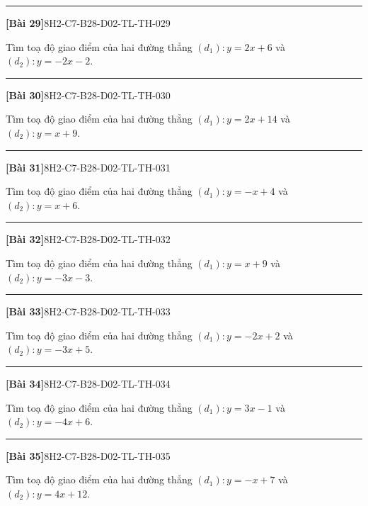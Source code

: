 \documentclass[12pt,a4paper]{article}
\newif\ifloigiai
\newenvironment{cauhoi}[2]{%
  \par\medskip\noindent\rule{\textwidth}{0.4pt}\par\nopagebreak
  \noindent\textbf{[#1]}\hfill{\scriptsize\ttfamily #2}\par\nopagebreak\smallskip}{\par}
\newcommand{\loigiai}[1]{\ifloigiai\par\smallskip\noindent\textit{Lời giải.} #1\par\fi}
\begin{document}
\begin{cauhoi}{Bài 29}{8H2-C7-B28-D02-TL-TH-029}
Tìm toạ độ giao điểm của hai đường thẳng $(d_1): y=2x+6$ và $(d_2): y=-2x-2$.
\loigiai{Hoành độ giao điểm là nghiệm của phương trình $2x+6=-2x-2$, suy ra $4x=-8$ nên $x=-2$. Thay vào $(d_1)$: $y=2\cdot(-2)+6=2$. Vậy giao điểm là $(-2;2)$.}
\end{cauhoi}
\begin{cauhoi}{Bài 30}{8H2-C7-B28-D02-TL-TH-030}
Tìm toạ độ giao điểm của hai đường thẳng $(d_1): y=2x+14$ và $(d_2): y=x+9$.
\loigiai{Hoành độ giao điểm là nghiệm của phương trình $2x+14=x+9$, suy ra $x=-5$ nên $x=-5$. Thay vào $(d_1)$: $y=2\cdot(-5)+14=4$. Vậy giao điểm là $(-5;4)$.}
\end{cauhoi}
\begin{cauhoi}{Bài 31}{8H2-C7-B28-D02-TL-TH-031}
Tìm toạ độ giao điểm của hai đường thẳng $(d_1): y=-x+4$ và $(d_2): y=x+6$.
\loigiai{Hoành độ giao điểm là nghiệm của phương trình $-x+4=x+6$, suy ra $-2x=2$ nên $x=-1$. Thay vào $(d_1)$: $y=-1\cdot(-1)+4=5$. Vậy giao điểm là $(-1;5)$.}
\end{cauhoi}
\begin{cauhoi}{Bài 32}{8H2-C7-B28-D02-TL-TH-032}
Tìm toạ độ giao điểm của hai đường thẳng $(d_1): y=x+9$ và $(d_2): y=-3x-3$.
\loigiai{Hoành độ giao điểm là nghiệm của phương trình $x+9=-3x-3$, suy ra $4x=-12$ nên $x=-3$. Thay vào $(d_1)$: $y=1\cdot(-3)+9=6$. Vậy giao điểm là $(-3;6)$.}
\end{cauhoi}
\begin{cauhoi}{Bài 33}{8H2-C7-B28-D02-TL-TH-033}
Tìm toạ độ giao điểm của hai đường thẳng $(d_1): y=-2x+2$ và $(d_2): y=-3x+5$.
\loigiai{Hoành độ giao điểm là nghiệm của phương trình $-2x+2=-3x+5$, suy ra $x=3$ nên $x=3$. Thay vào $(d_1)$: $y=-2\cdot(3)+2=-4$. Vậy giao điểm là $(3;-4)$.}
\end{cauhoi}
\begin{cauhoi}{Bài 34}{8H2-C7-B28-D02-TL-TH-034}
Tìm toạ độ giao điểm của hai đường thẳng $(d_1): y=3x-1$ và $(d_2): y=-4x+6$.
\loigiai{Hoành độ giao điểm là nghiệm của phương trình $3x-1=-4x+6$, suy ra $7x=7$ nên $x=1$. Thay vào $(d_1)$: $y=3\cdot(1)-1=2$. Vậy giao điểm là $(1;2)$.}
\end{cauhoi}
\begin{cauhoi}{Bài 35}{8H2-C7-B28-D02-TL-TH-035}
Tìm toạ độ giao điểm của hai đường thẳng $(d_1): y=-x+7$ và $(d_2): y=4x+12$.
\loigiai{Hoành độ giao điểm là nghiệm của phương trình $-x+7=4x+12$, suy ra $-5x=5$ nên $x=-1$. Thay vào $(d_1)$: $y=-1\cdot(-1)+7=8$. Vậy giao điểm là $(-1;8)$.}
\end{cauhoi}
\end{document}
